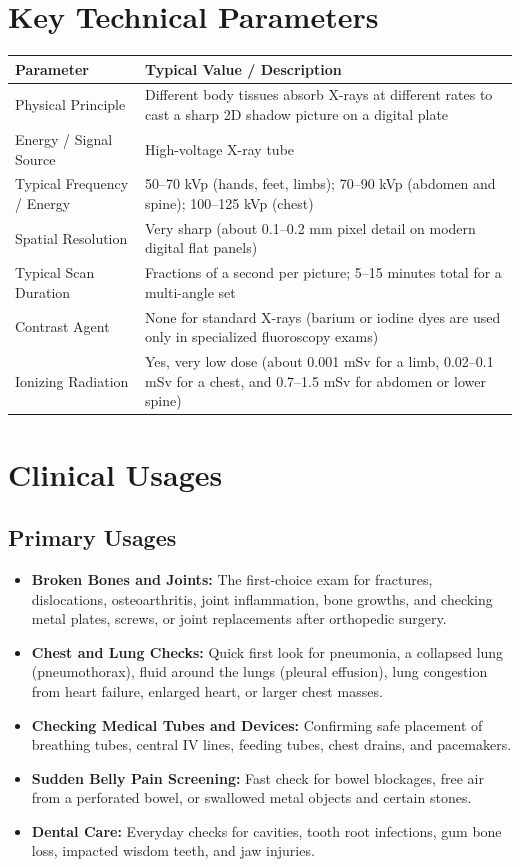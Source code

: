 \section{Key Technical Parameters}

\noindent
\begin{tabularx}{\textwidth}{@{}l X@{}}
\toprule
\textbf{Parameter} & \textbf{Typical Value / Description} \\
\midrule
Physical Principle & Different body tissues absorb X-rays at different rates to cast a sharp 2D shadow picture on a digital plate \\
Energy / Signal Source & High-voltage X-ray tube \\
Typical Frequency / Energy & 50--70 kVp (hands, feet, limbs); 70--90 kVp (abdomen and spine); 100--125 kVp (chest) \\
Spatial Resolution & Very sharp (about 0.1--0.2 mm pixel detail on modern digital flat panels) \\
Typical Scan Duration & Fractions of a second per picture; 5--15 minutes total for a multi-angle set \\
Contrast Agent & None for standard X-rays (barium or iodine dyes are used only in specialized fluoroscopy exams) \\
Ionizing Radiation & Yes, very low dose (about 0.001 mSv for a limb, 0.02--0.1 mSv for a chest, and 0.7--1.5 mSv for abdomen or lower spine) \\
\bottomrule
\end{tabularx}

\section{Clinical Usages}

\subsection{Primary Usages}

\begin{itemize}
    \item \textbf{Broken Bones and Joints:} The first-choice exam for fractures, dislocations, osteoarthritis, joint inflammation, bone growths, and checking metal plates, screws, or joint replacements after orthopedic surgery.
    \item \textbf{Chest and Lung Checks:} Quick first look for pneumonia, a collapsed lung (pneumothorax), fluid around the lungs (pleural effusion), lung congestion from heart failure, enlarged heart, or larger chest masses.
    \item \textbf{Checking Medical Tubes and Devices:} Confirming safe placement of breathing tubes, central IV lines, feeding tubes, chest drains, and pacemakers.
    \item \textbf{Sudden Belly Pain Screening:} Fast check for bowel blockages, free air from a perforated bowel, or swallowed metal objects and certain stones.
    \item \textbf{Dental Care:} Everyday checks for cavities, tooth root infections, gum bone loss, impacted wisdom teeth, and jaw injuries.
\end{itemize}

